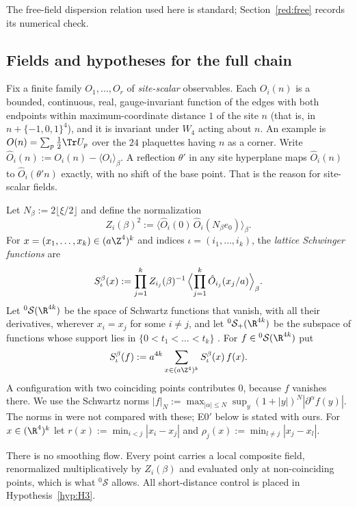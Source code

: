 The free-field dispersion relation used here is standard; Section~\ref{red:free} records its numerical check.

\subsection{Fields and hypotheses for the full chain}\label{red:S-setting}

Fix a finite family $O_1,\dots,O_r$ of \emph{site-scalar} observables. Each $O_i(n)$ is a bounded, continuous, real, gauge-invariant function of the edges with both endpoints within maximum-coordinate distance $1$ of the site $n$ (that is, in $n+\{-1,0,1\}^4$), and it is invariant under $W_4$ acting about $n$. An example is $O(n)=\sum_p\tfrac12\Tr U_p$ over the $24$ plaquettes having $n$ as a corner. Write $\hat O_i(n):=O_i(n)-\langle O_i\rangle_\beta$. A reflection $\theta'$ in any site hyperplane maps $\hat O_i(n)$ to $\hat O_i(\theta'n)$ exactly, with no shift of the base point. That is the reason for site-scalar fields.

Let $N_\beta:=2\lfloor\xi/2\rfloor$ and define the normalization
\[
  Z_i(\beta)^2:=\langle\hat O_i(0)\,\hat O_i(N_\beta e_0)\rangle_\beta .
\]
For $x=(x_1,\dots,x_k)\in(a\Z^4)^k$ and indices $\iota=(i_1,\dots,i_k)$, the \emph{lattice Schwinger functions} are
\begin{equation}\label{red:Sbeta}
  S^\beta_\iota(x):=\prod_{j=1}^k Z_{i_j}(\beta)^{-1}\,\Bigl\langle\prod_{j=1}^k\hat O_{i_j}(x_j/a)\Bigr\rangle_\beta .
\end{equation}
Let ${}^0\mathcal S(\R^{4k})$ be the space of Schwartz functions that vanish, with all their derivatives, wherever $x_i=x_j$ for some $i\ne j$, and let ${}^0\mathcal S_+(\R^{4k})$ be the subspace of functions whose support lies in $\{0<t_1<\dots<t_k\}$ \cite[eq.~(2.25)]{KQR21}. For $f\in{}^0\mathcal S(\R^{4k})$ put
\[
  S^\beta_\iota(f):=a^{4k}\sum_{x\in(a\Z^4)^k}S^\beta_\iota(x)\,f(x).
\]
A configuration with two coinciding points contributes $0$, because $f$ vanishes there. We use the Schwartz norms $|f|_N:=\max_{|\alpha|\le N}\sup_y(1+|y|)^N|\partial^\alpha f(y)|$. The norms in \cite[eq.~(9.18)]{KQR21} were not compared with these; E0$'$ below is stated with ours. For $x\in(\R^4)^k$ let $r(x):=\min_{i<j}|x_i-x_j|$ and $\rho_j(x):=\min_{l\ne j}|x_j-x_l|$.

There is no smoothing flow. Every point carries a local composite field, renormalized multiplicatively by $Z_i(\beta)$ and evaluated only at non-coinciding points, which is what ${}^0\mathcal S$ allows. All short-distance control is placed in Hypothesis~\ref{hyp:H3}.


